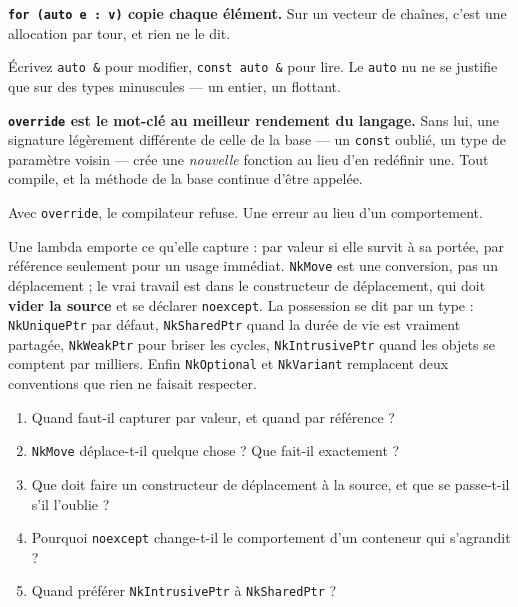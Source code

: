\begin{nkpiege}
\textbf{\texttt{for (auto e : v)} copie chaque élément.} Sur un vecteur de
chaînes, c'est une allocation par tour, et rien ne le dit.

Écrivez \texttt{auto \&} pour modifier, \texttt{const auto \&} pour lire. Le
\texttt{auto} nu ne se justifie que sur des types minuscules --- un entier, un
flottant.
\end{nkpiege}

\begin{nkretenir}
\textbf{\texttt{override} est le mot-clé au meilleur rendement du langage.} Sans
lui, une signature légèrement différente de celle de la base --- un \texttt{const}
oublié, un type de paramètre voisin --- crée une \emph{nouvelle} fonction au lieu
d'en redéfinir une. Tout compile, et la méthode de la base continue d'être
appelée.

Avec \texttt{override}, le compilateur refuse. Une erreur au lieu d'un
comportement.
\end{nkretenir}

\begin{nkbilan}
Une lambda emporte ce qu'elle capture : par valeur si elle survit à sa portée,
par référence seulement pour un usage immédiat. \texttt{NkMove} est une
conversion, pas un déplacement ; le vrai travail est dans le constructeur de
déplacement, qui doit \textbf{vider la source} et se déclarer \texttt{noexcept}.
La possession se dit par un type : \texttt{NkUniquePtr} par défaut,
\texttt{NkSharedPtr} quand la durée de vie est vraiment partagée,
\texttt{NkWeakPtr} pour briser les cycles, \texttt{NkIntrusivePtr} quand les
objets se comptent par milliers. Enfin \texttt{NkOptional} et \texttt{NkVariant}
remplacent deux conventions que rien ne faisait respecter.
\end{nkbilan}

\begin{nkquestions}
\begin{enumerate}
\item Quand faut-il capturer par valeur, et quand par référence ?
\item \texttt{NkMove} déplace-t-il quelque chose ? Que fait-il exactement ?
\item Que doit faire un constructeur de déplacement à la source, et que
      se passe-t-il s'il l'oublie ?
\item Pourquoi \texttt{noexcept} change-t-il le comportement d'un conteneur qui
      s'agrandit ?
\item Quand préférer \texttt{NkIntrusivePtr} à \texttt{NkSharedPtr} ?
\end{enumerate}
\end{nkquestions}

